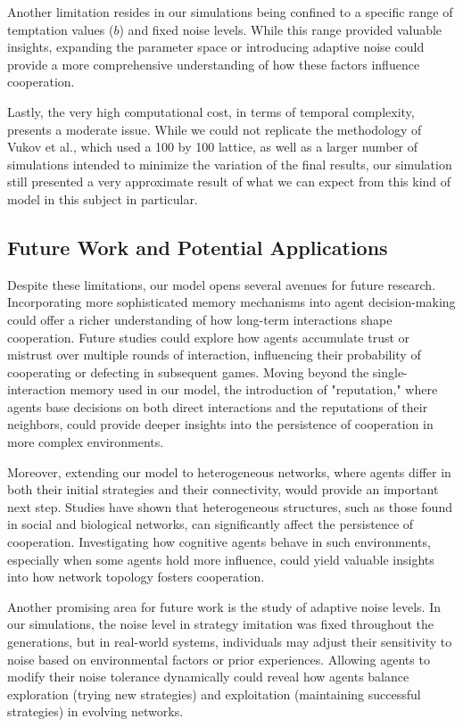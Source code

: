\documentclass[runningheads]{llncs}
\begin{document}
Another limitation resides in our simulations being confined to a specific range of temptation values (\( b \)) and fixed noise levels. While this range provided valuable insights, expanding the parameter space or introducing adaptive noise could provide a more comprehensive understanding of how these factors influence cooperation.

Lastly, the very high computational cost, in terms of temporal complexity, presents
a moderate issue. While we could not replicate the methodology of Vukov et al.,
which used a 100 by 100 lattice, as well as a larger number of simulations intended
to minimize the variation of the final results, our simulation still presented
a very approximate result of what we can expect from this kind of model in this
subject in particular.

\subsection{Future Work and Potential Applications}
Despite these limitations, our model opens several avenues for future research. Incorporating more sophisticated memory mechanisms into agent decision-making could offer a richer understanding of how long-term interactions shape cooperation. Future studies could explore how agents accumulate trust or mistrust over multiple rounds of interaction, influencing their probability of cooperating or defecting in subsequent games. Moving beyond the single-interaction memory used in our model, the introduction of "reputation," where agents base decisions on both direct interactions and the reputations of their neighbors, could provide deeper insights into the persistence of cooperation in more complex environments.

Moreover, extending our model to heterogeneous networks, where agents differ in both their initial strategies and their connectivity, would provide an important next step. Studies have shown that heterogeneous structures, such as those found in social and biological networks, can significantly affect the persistence of cooperation. Investigating how cognitive agents behave in such environments, especially when some agents hold more influence, could yield valuable insights into how network topology fosters cooperation.

Another promising area for future work is the study of adaptive noise levels. In our simulations, the noise level in strategy imitation was fixed throughout the generations, but in real-world systems, individuals may adjust their sensitivity to noise based on environmental factors or prior experiences. Allowing agents to modify their noise tolerance dynamically could reveal how agents balance exploration (trying new strategies) and exploitation (maintaining successful strategies) in evolving networks.
\end{document}
